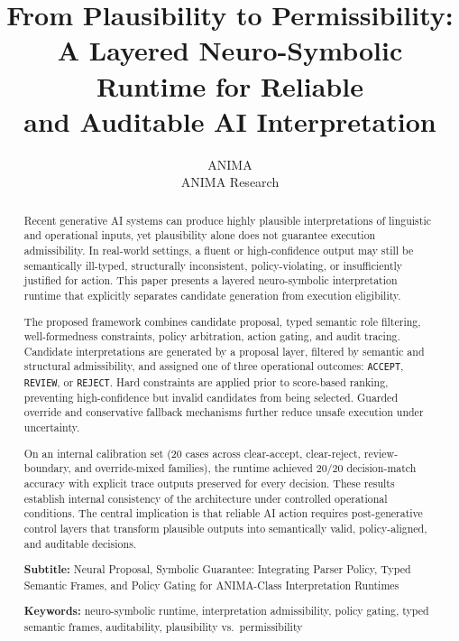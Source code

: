 \documentclass[11pt,a4paper]{article}
\title{%
  \textbf{From Plausibility to Permissibility:\\
  A Layered Neuro-Symbolic Runtime for Reliable\\
  and Auditable AI Interpretation}
}
\author{%
  ANIMA \\
  ANIMA Research \\
}
\date{}
\begin{document}
\maketitle

\begin{abstract}
Recent generative AI systems can produce highly plausible interpretations of linguistic and operational inputs, yet plausibility alone does not guarantee execution admissibility. In real-world settings, a fluent or high-confidence output may still be semantically ill-typed, structurally inconsistent, policy-violating, or insufficiently justified for action. This paper presents a layered neuro-symbolic interpretation runtime that explicitly separates candidate generation from execution eligibility.

The proposed framework combines candidate proposal, typed semantic role filtering, well-formedness constraints, policy arbitration, action gating, and audit tracing. Candidate interpretations are generated by a proposal layer, filtered by semantic and structural admissibility, and assigned one of three operational outcomes: \texttt{ACCEPT}, \texttt{REVIEW}, or \texttt{REJECT}. Hard constraints are applied prior to score-based ranking, preventing high-confidence but invalid candidates from being selected. Guarded override and conservative fallback mechanisms further reduce unsafe execution under uncertainty.

On an internal calibration set (20 cases across clear-accept, clear-reject, review-boundary, and override-mixed families), the runtime achieved 20/20 decision-match accuracy with explicit trace outputs preserved for every decision. These results establish internal consistency of the architecture under controlled operational conditions. The central implication is that reliable AI action requires post-generative control layers that transform plausible outputs into semantically valid, policy-aligned, and auditable decisions.

\vspace{6pt}
\noindent\textbf{Subtitle:} Neural Proposal, Symbolic Guarantee: Integrating Parser Policy, Typed Semantic Frames, and Policy Gating for ANIMA-Class Interpretation Runtimes

\vspace{6pt}
\noindent\textbf{Keywords:} neuro-symbolic runtime, interpretation admissibility, policy gating, typed semantic frames, auditability, plausibility vs.\ permissibility
\end{abstract}
\end{document}

